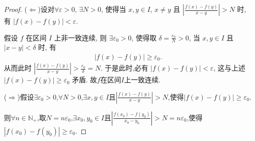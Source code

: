 \documentclass[lang=cn,newtx,10pt,scheme=chinese]{../Template/elegantbook}
\begin{document}
\begin{proof}
        ($\Leftarrow $)设对\(\forall \varepsilon >0\), \(\exists N>0\), 使得当 \(x,y\in I\), \(x\neq y\) 且 \(\left| \frac{f\left( x \right) -f\left( y \right)}{x-y} \right|>N\) 时, 有 \(\left| f\left( x \right) -f\left( y \right) \right|<\varepsilon\).

        假设 \(f\) 在区间 \(I\) 上非一致连续,
        则 \(\exists \varepsilon _0>0\), 使得取 \(\delta =\frac{\varepsilon _0}{N}>0\), 当 \(x,y\in I\) 且 \(\left| x-y \right|<\delta\) 时, 有
         \begin{align*}
            \left| f\left( x \right) -f\left( y \right) \right|\geqslant \varepsilon _0.
         \end{align*}
        从而此时 \(\left| \frac{f\left( x \right) -f\left( y \right)}{x-y} \right|>\frac{\varepsilon _0}{\delta}=N\).
        于是此时,必有 \(\left| f\left( x \right) -f\left( y \right) \right|<\varepsilon\), 这与上述 \(\left| f\left( x \right) -f\left( y \right) \right|\geqslant \varepsilon _0\) 矛盾. 故\(f\)在区间\(I\)上一致连续.

        ($\Rightarrow $)假设\(\exists \varepsilon _0>0\),\(\forall N>0\),\(\exists x,y\in I\)且\(\left| \frac{f\left( x \right) -f\left( y \right)}{x-y} \right|>N\),使得\(\left| f\left( x \right) -f\left( y \right) \right|\geqslant  \varepsilon _0\).
        
        则\(\forall n\in \mathbb{N} _+\),取\(N = n\varepsilon _0\),\(\exists x_0,y_0\in I\)且\(\left| \frac{f\left( x_0 \right) -f\left( y_0 \right)}{x_0-y_0} \right|>N = n\varepsilon _0\),使得\(\left| f\left( x_0 \right) -f\left( y_0 \right) \right|\geqslant  \varepsilon _0\).


\end{proof}
\end{document}
